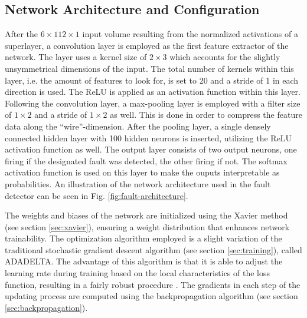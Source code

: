 \subsection{Network Architecture and Configuration}

After the \(6 \times 112 \times 1\) input volume resulting from the
normalized activations of a superlayer, a convolution layer
is employed as the first feature extractor of the network. The layer
uses a kernel size of \(2 \times 3\) which accounts for the slightly
unsymmetrical dimensions of the input. The total number of kernels
within this layer, i.e. the amount of features to look for, is set to
20 and a stride of 1 in each direction is used. The ReLU is applied
as an activation function within this layer.
Following the convolution layer, a max-pooling layer is employed with a
filter size of \(1 \times 2\) and a stride of \(1 \times 2\) as
well. This is done in order to compress the feature data along the
``wire''-dimension. After the pooling layer, a single densely
connected hidden layer with 100 hidden neurons is inserted, utilizing
the ReLU activation function as well. The output layer consists of two
output neurons, one firing if the designated fault was detected, the
other firing if not. The softmax activation function is used on this
layer to make the ouputs interpretable as probabilities. An
illustration of the network architecture used in the fault detector
can be seen in Fig. \ref{fig:fault-architecture}.

The weights and biases of the network are initialized using the Xavier
method (see section \ref{sec:xavier}), ensuring a weight distribution
that enhances network trainability. The optimization algorithm
employed is a slight variation of the traditional stochastic gradient
descent algorithm (see section \ref{sec:training}), called
ADADELTA. The advantage of this algorithm is that it is able to adjust
the learning rate during training based on the local characteristics
of the loss function, resulting in a fairly robust procedure
\cite{adadelta}. The gradients in each step of the updating process
are computed using the backpropagation algorithm (see section
\ref{sec:backpropagation}).

